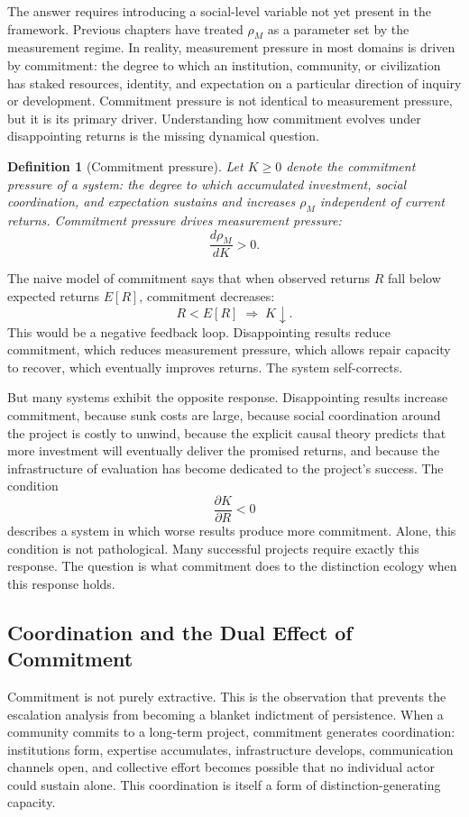 \documentclass[12pt, a4paper]{article}
\theoremstyle{flyxion}
\newtheorem{definition}{Definition}
\newcommand{\rhoM}{\rho_{M}}
\begin{document}
The answer requires introducing a social-level variable not yet present in the framework. Previous chapters have treated $\rhoM$ as a parameter set by the measurement regime. In reality, measurement pressure in most domains is driven by commitment: the degree to which an institution, community, or civilization has staked resources, identity, and expectation on a particular direction of inquiry or development. Commitment pressure is not identical to measurement pressure, but it is its primary driver. Understanding how commitment evolves under disappointing returns is the missing dynamical question.

\begin{definition}[Commitment pressure]
Let $K \geq 0$ denote the commitment pressure of a system: the degree to which accumulated investment, social coordination, and expectation sustains and increases $\rhoM$ independent of current returns. Commitment pressure drives measurement pressure:
\[
  \frac{d\rhoM}{dK} > 0.
\]
\end{definition}

The naive model of commitment says that when observed returns $R$ fall below expected returns $E[R]$, commitment decreases:
\[
  R < E[R] \;\Rightarrow\; K \downarrow.
\]
This would be a negative feedback loop. Disappointing results reduce commitment, which reduces measurement pressure, which allows repair capacity to recover, which eventually improves returns. The system self-corrects.

But many systems exhibit the opposite response. Disappointing results increase commitment, because sunk costs are large, because social coordination around the project is costly to unwind, because the explicit causal theory predicts that more investment will eventually deliver the promised returns, and because the infrastructure of evaluation has become dedicated to the project's success. The condition
\[
  \frac{\partial K}{\partial R} < 0
\]
describes a system in which worse results produce more commitment. Alone, this condition is not pathological. Many successful projects require exactly this response. The question is what commitment does to the distinction ecology when this response holds.

\subsection*{Coordination and the Dual Effect of Commitment}

Commitment is not purely extractive. This is the observation that prevents the escalation analysis from becoming a blanket indictment of persistence. When a community commits to a long-term project, commitment generates coordination: institutions form, expertise accumulates, infrastructure develops, communication channels open, and collective effort becomes possible that no individual actor could sustain alone. This coordination is itself a form of distinction-generating capacity.
\end{document}
